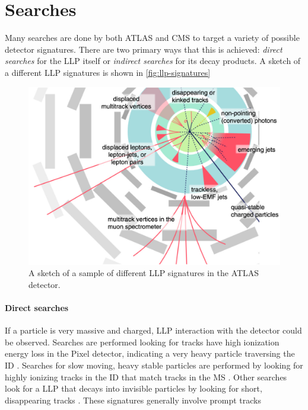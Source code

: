 \section{\label{sec:llp-searches}Searches}

Many searches are done by both \ac{ATLAS} and \ac{CMS} to target a variety of possible detector signatures. There are two primary ways that this is achieved: \emph{direct searches} for the \ac{LLP} itself or \emph{indirect searches} for its decay products. A sketch of a different \ac{LLP} signatures is shown in \autoref{fig:llp-signatures} 

\begin{figure}[!h]
\centering
\includegraphics[width=.8\textwidth]{figures/theory/llp-signatures.jpg}
\caption{A sketch of a sample of different \ac{LLP} signatures in the \ac{ATLAS} detector. \cite{llpdiagram}}
\label{fig:llp-signatures}
\end{figure}


\paragraph{Direct searches} 

If a particle is very massive and charged, \ac{LLP} interaction with the detector could be observed. Searches are performed looking for tracks have high ionization energy loss in the Pixel detector, indicating a very heavy particle traversing the \ac{ID} \cite{SUSY-2014-09}. Searches for slow moving, heavy stable particles are performed by looking for highly ionizing tracks in the \ac{ID} that match tracks in the \ac{MS} \cite{SUSY-2016-02}. Other searches look for a \ac{LLP} that decays into invisible particles by looking for short, disappearing tracks \cite{SUSY-2016-06, CMS-EXO-16-044}. These signatures generally involve prompt tracks

